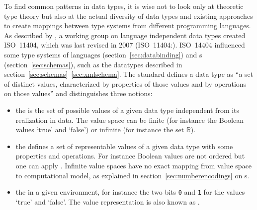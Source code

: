 To find common patterns in data types, it is wise not to look only at theoretic
type theory but also at the actual diversity of data types and existing
approaches to create mappings between type systems from different programming
languages. As described by \textcite{Meek1994a,Meek1994b}, a working group on
language independent data types created ISO~11404, which was last revised in
2007 (ISO~11404:\citeyear{ISO11404}). ISO~14404 influenced some type systems of
 languages (section~\ref{sec:databinding}) and s (section~\ref{sec:schemas}), such as the  datatypes
\cite{Biron2004} described in section~\ref{sec:schemas}~\ref{sec:xmlschema}.
The standard defines a data type as ``a set of distinct values, characterized
by properties of those values and by operations on those values'' and
distinguishes three notions:

\begin{itemize}
\item the  is the set of possible values of a given data type
  independent from its realization in data. The value space can be finite (for
  instance the Boolean values `true' and `false') or infinite (for instance the 
  set $\mathbb{R}$).
\item the  defines a set of representable values of a
  given data type with some properties and operations. For instance Boolean
  values are not ordered but one can apply . Infinite
  value spaces have no exact mapping from value space to computational
  model, as explained in section~\ref{sec:numberencodings} on s.
\item the  in a given environment, for instance the
  two bits \verb|0| and \verb|1| for the values `true' and `false'. The value 
  representation is also known as .
\end{itemize}


